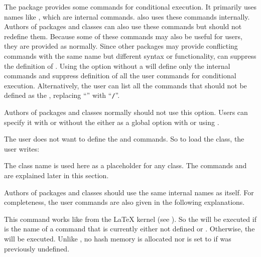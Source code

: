 \begin{Declaration}
\end{Declaration}
The  package provides some commands for conditional
execution. It primarily uses names like
, which are internal
commands. \KOMAScript{} also uses these commands internally. Authors of
packages and classes can also use these commands but should not redefine them.
Because some of these commands may also be useful for users, they are provided
as  normally. Since other packages may
provide conflicting commands with the same name but different syntax or
functionality,  can suppress the definition of
. Using the  option without a
 will define only the internal commands and suppress definition
of all the user commands for conditional execution. Alternatively, the user
can list all the commands that should not be defined as the ,
replacing ``\Macro{}'' with ``\texttt{/}''.

Authors of packages and classes normally should not use this option. Users can
specify it with or without the  either as a global option with
 or using
.
\begin{Example}
  The user does not want  to define the
   and
   commands. So to load the class,
  the user writes:
  The class name  is used here as a placeholder for any class. The
  commands  and
   are explained later in this
  section.
\end{Example}

Authors of packages and classes should use the same internal names as
\KOMAScript{} itself. For completeness, the user commands are also given in
the following explanations.%
\EndIndexGroup


\begin{Declaration}
\end{Declaration}
This command works like  from the \LaTeX{} kernel (see
\cite{latex:source2e}). So the  will be executed if
 is the name of a command that is currently either not defined or
. Otherwise, the  will be executed. Unlike
, no hash memory is allocated nor is 
set to  if  was previously undefined.%
\EndIndexGroup

